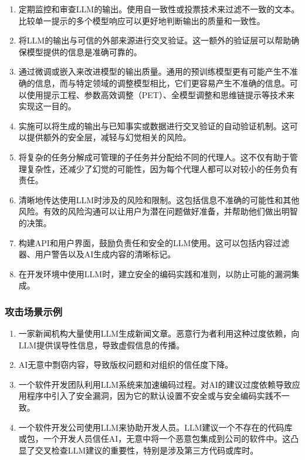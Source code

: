 \documentclass[
]{article}
\providecommand{\tightlist}{%
  \setlength{\itemsep}{0pt}\setlength{\parskip}{0pt}}
\begin{document}
\begin{enumerate}
\def\labelenumi{\arabic{enumi}.}
\tightlist
\item
  定期监控和审查LLM的输出。使用自一致性或投票技术来过滤不一致的文本。比较单一提示的多个模型响应可以更好地判断输出的质量和一致性。
\item
  将LLM的输出与可信的外部来源进行交叉验证。这一额外的验证层可以帮助确保模型提供的信息是准确可靠的。
\item
  通过微调或嵌入来改进模型的输出质量。通用的预训练模型更有可能产生不准确的信息，而与特定领域的调整模型相比，它们更容易产生不准确的信息。可以使用提示工程、参数高效调整（PET）、全模型调整和思维链提示等技术来实现这一目的。
\item
  实施可以将生成的输出与已知事实或数据进行交叉验证的自动验证机制。这可以提供额外的安全层，减轻与幻觉相关的风险。
\item
  将复杂的任务分解成可管理的子任务并分配给不同的代理人。这不仅有助于管理复杂性，还减少了幻觉的可能性，因为每个代理人都可以对较小的任务负有责任。
\item
  清晰地传达使用LLM时涉及的风险和限制。这包括信息不准确的可能性和其他风险。有效的风险沟通可以让用户为潜在问题做好准备，并帮助他们做出明智的决策。
\item
  构建API和用户界面，鼓励负责任和安全的LLM使用。这可以包括内容过滤器、用户警告以及AI生成内容的清晰标记。
\item
  在开发环境中使用LLM时，建立安全的编码实践和准则，以防止可能的漏洞集成。
\end{enumerate}

\subsubsection{攻击场景示例}\label{ux653bux51fbux573aux666fux793aux4f8b}

\begin{enumerate}
\def\labelenumi{\arabic{enumi}.}
\tightlist
\item
  一家新闻机构大量使用LLM生成新闻文章。恶意行为者利用这种过度依赖，向LLM提供误导性信息，导致虚假信息的传播。
\item
  AI无意中剽窃内容，导致版权问题和对组织的信任度下降。
\item
  一个软件开发团队利用LLM系统来加速编码过程。对AI的建议过度依赖导致应用程序中引入了安全漏洞，因为它的默认设置不安全或与安全编码实践不一致。
\item
  一个软件开发公司使用LLM来协助开发人员。LLM建议一个不存在的代码库或包，一个开发人员信任AI，无意中将一个恶意包集成到公司的软件中。这凸显了交叉检查LLM建议的重要性，特别是涉及第三方代码或库时。
\end{enumerate}
\end{document}
